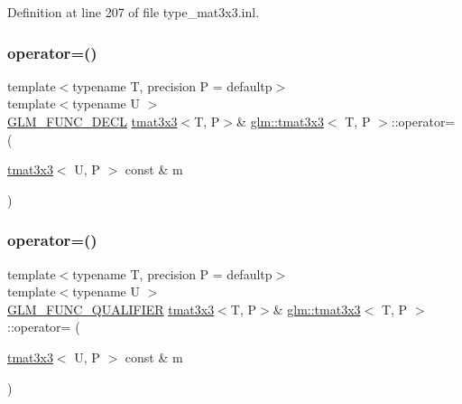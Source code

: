Definition at line 207 of file type\+\_\+mat3x3.\+inl.

\mbox{\label{structglm_1_1tmat3x3_a4cfacf82df6bb99bca19076bfd27c3f9}} 
\subsubsection{\texorpdfstring{operator=()}{operator=()}\hspace{0.1cm}{\footnotesize\ttfamily [2/3]}}
{\footnotesize\ttfamily template$<$typename T, precision P = defaultp$>$ \\
template$<$typename U $>$ \\
\mbox{\hyperlink{setup_8hpp_ab2d052de21a70539923e9bcbf6e83a51}{G\+L\+M\+\_\+\+F\+U\+N\+C\+\_\+\+D\+E\+CL}} \mbox{\hyperlink{structglm_1_1tmat3x3}{tmat3x3}}$<$T, P$>$\& \mbox{\hyperlink{structglm_1_1tmat3x3}{glm\+::tmat3x3}}$<$ T, P $>$\+::operator= (\begin{DoxyParamCaption}\item[{\mbox{\hyperlink{structglm_1_1tmat3x3}{tmat3x3}}$<$ U, P $>$ const \&}]{m }\end{DoxyParamCaption})}

\mbox{\label{structglm_1_1tmat3x3_a3d87b69cdea2bbbcca29b6ba356ae943}} 
\subsubsection{\texorpdfstring{operator=()}{operator=()}\hspace{0.1cm}{\footnotesize\ttfamily [3/3]}}
{\footnotesize\ttfamily template$<$typename T, precision P = defaultp$>$ \\
template$<$typename U $>$ \\
\mbox{\hyperlink{setup_8hpp_a33fdea6f91c5f834105f7415e2a64407}{G\+L\+M\+\_\+\+F\+U\+N\+C\+\_\+\+Q\+U\+A\+L\+I\+F\+I\+ER}} \mbox{\hyperlink{structglm_1_1tmat3x3}{tmat3x3}}$<$T, P$>$\& \mbox{\hyperlink{structglm_1_1tmat3x3}{glm\+::tmat3x3}}$<$ T, P $>$\+::operator= (\begin{DoxyParamCaption}\item[{\mbox{\hyperlink{structglm_1_1tmat3x3}{tmat3x3}}$<$ U, P $>$ const \&}]{m }\end{DoxyParamCaption})}



